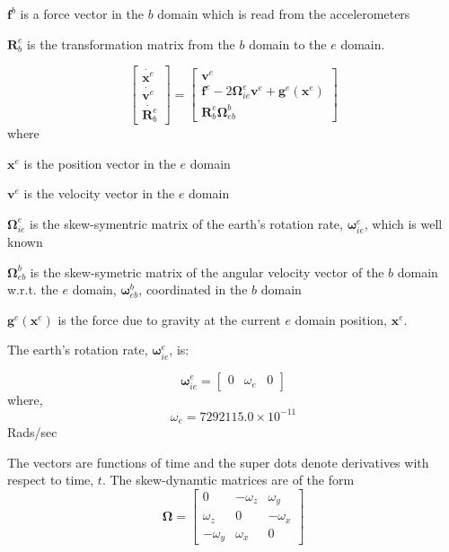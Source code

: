 \documentclass[a4paper]{report}
\numberwithin{equation}{chapter}
\newcommand{\mat}[1]{\boldsymbol{#1}}
\begin{document}
  $\mat{f}^b$ is a force vector in the $b$ domain which is read from the accelerometers

  $\mat{R}^e_b$ is the transformation matrix from the $b$ domain to the $e$ domain.

\begin{equation}
\begin{bmatrix}
\dot{\mat{x}^e}\\
\dot{\mat{v}^e}\\
\dot{\mat{R}^e_b}
\end{bmatrix}
=
\begin{bmatrix}
\mat{v}^e\\
\mat{f}^e - 2\mat{\Omega}^e_{ie} \mat{v}^e + \mat{g}^e \left( \mat{x}^e \right)\\
\mat{R}^e_b \mat{\Omega}^b_{eb}
\end{bmatrix}
\label{eqn:dynamic}
\end{equation}
where

  $\mat{x}^e$ is the position vector in the $e$ domain

  $\mat{v}^e$ is the velocity vector in the $e$ domain

  $\mat{\Omega}^e_{ie}$ is the skew-symentric matrix of the earth's rotation rate, $\mat{\omega}^e_{ie}$, which is well known

  $\mat{\Omega}^b_{eb}$ is the skew-symetric matrix of the angular velocity vector of the $b$ domain w.r.t. the $e$ domain, $\mat{\omega}^b_{eb}$, coordinated in the $b$ domain

  $\mat{g}^e \left( \mat{x}^e \right)$ is the force due to gravity at the current $e$ domain position, $\mat{x}^e$.

\bigskip

The earth's rotation rate, $\mat{\omega}^e_{ie}$, is:

\begin{equation}
\mat{\omega}^e_{ie} =
\begin{bmatrix}
0 & \omega_e & 0
\end{bmatrix}
\end{equation}
where,
\begin{equation}
\omega_e = 7292115.0 \times 10^{-11}
\end{equation} Rads/sec

\bigskip

The vectors are functions of time and the super dots denote derivatives with respect to time, $t$. The skew-dynamtic matrices are of the form
\begin{equation}
\mat{\Omega} =
\begin{bmatrix}
0 & - \omega_z & \omega_y\\
\omega_z & 0 & - \omega_x\\
- \omega_y & \omega_x & 0
\end{bmatrix}
\end{equation}
\end{document}
